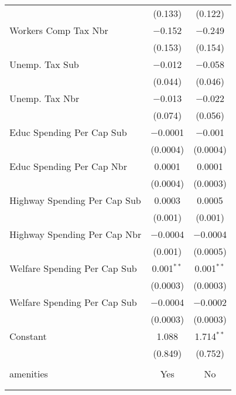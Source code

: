 \begin{table}[!htbp]
\begin{tabular}{@{\extracolsep{5pt}}lcc}
  & (0.133) & (0.122) \\ 
  Workers Comp Tax Nbr & $-$0.152 & $-$0.249 \\ 
  & (0.153) & (0.154) \\ 
  Unemp. Tax Sub & $-$0.012 & $-$0.058 \\ 
  & (0.044) & (0.046) \\ 
  Unemp. Tax Nbr & $-$0.013 & $-$0.022 \\ 
  & (0.074) & (0.056) \\ 
  Educ Spending Per Cap Sub & $-$0.0001 & $-$0.001 \\ 
  & (0.0004) & (0.0004) \\ 
  Educ Spending Per Cap Nbr & 0.0001 & 0.0001 \\ 
  & (0.0004) & (0.0003) \\ 
  Highway Spending Per Cap Sub & 0.0003 & 0.0005 \\ 
  & (0.001) & (0.001) \\ 
  Highway Spending Per Cap Nbr & $-$0.0004 & $-$0.0004 \\ 
  & (0.001) & (0.0005) \\ 
  Welfare Spending Per Cap Sub & 0.001$^{**}$ & 0.001$^{**}$ \\ 
  & (0.0003) & (0.0003) \\ 
  Welfare Spending Per Cap Sub & $-$0.0004 & $-$0.0002 \\ 
  & (0.0003) & (0.0003) \\ 
  Constant & 1.088 & 1.714$^{**}$ \\ 
  & (0.849) & (0.752) \\ 
 \hline \\[-1.8ex] 
amenities & Yes & No \\ 
\hline \\[-1.8ex] 
\hline 
\hline \\[-1.8ex] 
\end{tabular} 
\end{table} 
